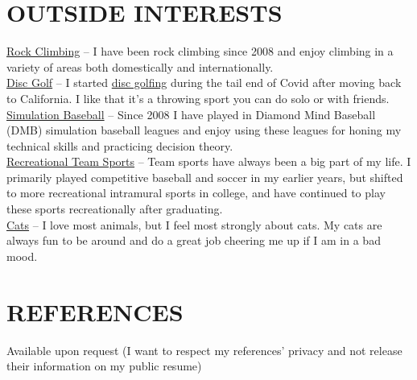 \documentclass[margin]{res}
\begin{document}
\begin{resume}
\section{OUTSIDE INTERESTS}
\textbullet\hspace{3pt} \href{http://connor-r.github.io/cr_interests.html#bouldering}{Rock Climbing}  -- I have been rock climbing since 2008 and enjoy climbing in a variety of areas both domestically and internationally.
\smallskip\\\textbullet\hspace{3pt} \href{http://connor-r.github.io/cr_interests.html\#discGolf}{Disc Golf} -- I started \href{https://www.pdga.com/player/225722}{disc golfing} during the tail end of Covid after moving back to California. I like that it's a throwing sport you can do solo or with friends.
\smallskip\\\textbullet\hspace{3pt} \href{http://connor-r.github.io/Posts/sim_league_team_projections.html}{Simulation Baseball} -- Since 2008 I have played in Diamond Mind Baseball (DMB) simulation baseball leagues and enjoy using these leagues for honing my technical skills and practicing decision theory.
\smallskip\\\textbullet\hspace{3pt} \href{http://connor-r.github.io/cr_interests.html#recSports}{Recreational Team Sports} --  Team sports have always been a big part of my life. I primarily played competitive baseball and soccer in my earlier years, but shifted to more recreational intramural sports in college, and have continued to play these sports recreationally after graduating. 
\smallskip\\\textbullet\hspace{3pt} \href{http://connor-r.github.io/cr_interests.html#cats}{Cats} -- I love most animals, but I feel most strongly about cats. My cats are always fun to be around and do a great job cheering me up if I am in a bad mood.

\section{REFERENCES}
Available upon request (I want to respect my references' privacy and not release their information on my public resume)


\end{resume}
\end{document}
